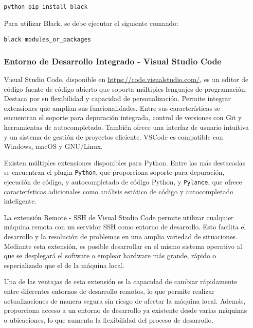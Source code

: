 \begin{lstlisting}[language=bash]
python pip install black
\end{lstlisting}

Para utilizar Black, se debe ejecutar el siguiente comando:

\begin{lstlisting}[language=bash]
black modules_or_packages
\end{lstlisting}

\subsubsection{Entorno de Desarrollo Integrado - Visual Studio Code}

Visual Studio Code, disponible en \url{https://code.visualstudio.com/}, es un editor de código fuente de código abierto que soporta múltiples lenguajes de programación. Destaca por su flexibilidad y capacidad de personalización. Permite integrar extensiones que amplían sus funcionalidades. Entre sus características se encuentran el soporte para depuración integrada, control de versiones con Git y herramientas de autocompletado. También ofrece una interfaz de usuario intuitiva y un sistema de gestión de proyectos eficiente. VSCode es compatible con Windows, macOS y GNU/Linux.

Existen múltiples extensiones disponibles para Python. Entre las más destacadas se encuentran el plugin \texttt{Python}, que proporciona soporte para depuración, ejecución de código, y autocompletado de código Python, y \texttt{Pylance}, que ofrece características adicionales como análisis estático de código y autocompletado inteligente.

La extensión Remote - SSH de Visual Studio Code permite utilizar cualquier máquina remota con un servidor SSH como entorno de desarrollo. Esto facilita el desarrollo y la resolución de problemas en una amplia variedad de situaciones. Mediante esta extensión, es posible desarrollar en el mismo sistema operativo al que se desplegará el software o emplear hardware más grande, rápido o especializado que el de la máquina local.

Una de las ventajas de esta extensión es la capacidad de cambiar rápidamente entre diferentes entornos de desarrollo remotos, lo que permite realizar actualizaciones de manera segura sin riesgo de afectar la máquina local. Además, proporciona acceso a un entorno de desarrollo ya existente desde varias máquinas o ubicaciones, lo que aumenta la flexibilidad del proceso de desarrollo.

